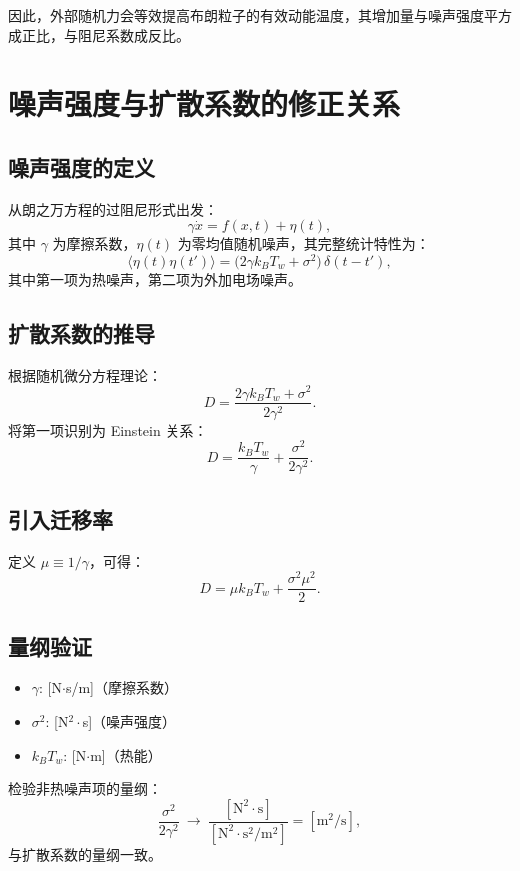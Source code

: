 \documentclass[a4paper]{report}
\begin{document}
因此，外部随机力会等效提高布朗粒子的有效动能温度，其增加量与噪声强度平方成正比，与阻尼系数成反比。

\section{噪声强度与扩散系数的修正关系}

\subsection{噪声强度的定义}
从朗之万方程的过阻尼形式出发：
\begin{equation}
\gamma \dot{x} = f(x,t) + \eta(t),
\end{equation}
其中 $\gamma$ 为摩擦系数，$\eta(t)$ 为零均值随机噪声，其完整统计特性为：
\begin{equation}
\langle \eta(t)\eta(t') \rangle = \big( 2\gamma k_B T_w + \sigma^2 \big) \, \delta(t-t'),
\end{equation}
其中第一项为热噪声，第二项为外加电场噪声。

\subsection{扩散系数的推导}
根据随机微分方程理论：
\begin{equation}
D = \frac{2\gamma k_B T_w + \sigma^2}{2\gamma^2}.
\end{equation}
将第一项识别为 Einstein 关系：
\begin{equation}
D = \frac{k_B T_w}{\gamma} + \frac{\sigma^2}{2\gamma^2}.
\end{equation}

\subsection{引入迁移率}
定义 $\mu \equiv 1/\gamma$，可得：
\begin{equation}
D = \mu k_B T_w + \frac{\sigma^2 \mu^2}{2}.
\end{equation}

\subsection{量纲验证}
\begin{itemize}
    \item $\gamma$: [N$\cdot$s/m]（摩擦系数）
    \item $\sigma^2$: [N$^{2}\cdot$s]（噪声强度）
    \item $k_B T_w$: [N$\cdot$m]（热能）
\end{itemize}
检验非热噪声项的量纲：
\begin{equation}
\frac{\sigma^2}{2\gamma^2} \ \rightarrow\  \frac{\mathrm{[N^2 \cdot s]}}{\mathrm{[N^2 \cdot s^2 / m^2]}} = \mathrm{[m^2/s]},
\end{equation}
与扩散系数的量纲一致。
\end{document}
